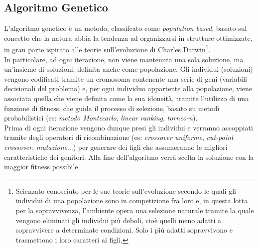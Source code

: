 \subsection{Algoritmo Genetico}
\noindent L'algoritmo genetico è un metodo, classifcato come \textit{population based}, basato sul concetto che la natura
abbia la tendenza ad organizzarsi in strutture ottimizzate, in gran parte ispirato
alle teorie sull'evoluzione di Charles Darwin\footnote[4]{Scienzato conosciuto
per le sue teorie sull'evoluzione secondo le quali gli individui di una
popolazione sono in competizione fra loro e, in questa
lotta per la sopravvivenza, l'ambiente opera una selezione naturale tramite la quale
vengono eliminati gli individui più deboli, cioè quelli meno adatti a sopravvivere a determinate
condizioni. Solo i più adatti sopravvivono e trasmettono i loro
caratteri ai figli.}.\\
\noindent In particolare, ad ogni iterazione, non viene mantenuta una sola soluzione, ma un'insieme di soluzioni, definita anche come popolazione.
Gli individui (soluzioni) vengono codificati tramite un cromosoma contenente una serie di geni (variabili decisionali del problema) e, per
ogni individuo appartente alla popolazione, viene associata quella che viene definita come la sua idoneità, tramite l'utilizzo di una
funzione di fitness, che guida il processo di selezione, basato su metodi probabilistici (es: \textit{metodo Montecarlo}, \textit{linear ranking}, \textit{torneo-n}).\\
Prima di ogni iterazione vengono dunque presi gli individui e verranno accoppiati tramite degli operatori di ricombinazione
(es: \textit{crossover uniforme}, \textit{cut-point crossover}, \textit{mutazione}...)
per generare dei figli che assumeranno le migliori caratteristiche dei genitori. Alla fine dell'algoritmo verrà scelta la soluzione con la maggior fitness possibile.\\

